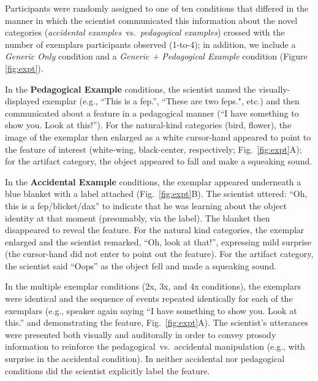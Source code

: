\documentclass[10pt,letterpaper]{article}
\begin{document}
Participants were randomly assigned to one of ten conditions that differed in the manner in which the scientist communicated this information about the novel categories (\emph{accidental examples}~vs.~\emph{pedagogical examples}) crossed with the number of exemplars participants observed (1-to-4); in addition, we include a \emph{Generic Only} condition and a \emph{Generic + Pedagogical Example} condition (Figure \ref{fig:expt}). 





In the \textbf{Pedagogical Example} conditions, the scientist named the visually-displayed exemplar (e.g., ``This is a fep.'', ``These are two feps.", etc.) and then communicated about a feature in a pedagogical manner (``I have something to show you. Look at this!''). 
For the natural-kind categories (bird, flower), the image of the exemplar then enlarged as a white cursor-hand appeared to point to the feature of interest (white-wing, black-center, respectively; Fig.~\ref{fig:expt}A); for the artifact category, the object appeared to fall and make a squeaking sound. 

In the \textbf{Accidental Example} conditions, the exemplar appeared underneath a blue blanket with a label attached (Fig.~\ref{fig:expt}B). 
The scientist uttered: ``Oh, this is a fep/blicket/dax'' to indicate that he was learning about the object identity at that moment (presumably, via the label).
The blanket then disappeared to reveal the feature.
For the natural kind categories, the exemplar enlarged and the scientist remarked, ``Oh, look at that!'', expressing mild surprise (the cursor-hand did not enter to point out the feature). 
For the artifact category, the scientist said ``Oops'' as the object fell and made a squeaking sound.

In the multiple exemplar conditions (2x, 3x, and 4x conditions), the exemplars were identical and the sequence of events repeated identically for each of the exemplars (e.g., speaker again saying ``I have something to show you. Look at this.'' and demonstrating the feature, Fig.~\ref{fig:expt}A).
The scientist's utterances were presented both visually and auditorally in order to convey prosody information to reinforce the pedagogical~vs.~accidental manipulation (e.g., with surprise in the accidental condition).
In neither accidental nor pedagogical conditions did the scientist explicitly label the feature. 

\end{document}
